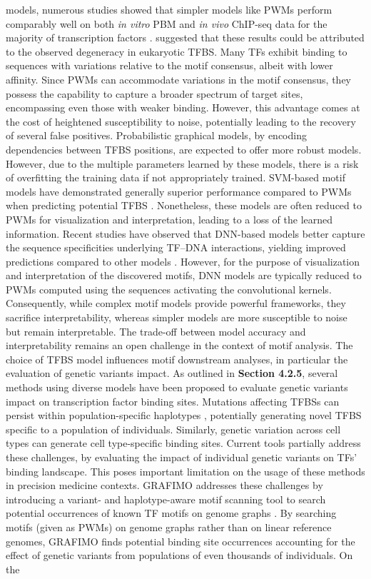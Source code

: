 \documentclass[a4paper, titlepage, openright]{book}
\newcommand{\grafimo}{GRAFIMO\xspace}
\begin{document}
models, numerous studies showed that simpler models like PWMs perform comparably well on both \emph{in vitro} PBM and \emph{in vivo} ChIP-seq data for the majority of transcription factors \citep{zhao2011quantitative,weirauch2013evaluation}. \cite{weirauch2013evaluation} suggested that these results could be attributed to the observed degeneracy in eukaryotic TFBS. Many TFs exhibit binding to sequences with variations relative to the motif consensus, albeit with lower affinity. Since PWMs can accommodate variations in the motif consensus, they possess the capability to capture a broader spectrum of target sites, encompassing even those with weaker binding. However, this advantage comes at the cost of heightened susceptibility to noise, potentially leading to the recovery of several false positives. Probabilistic graphical models, by encoding dependencies between TFBS positions, are expected to offer more robust models. However, due to the multiple parameters learned by these models, there is a risk of overfitting the training data if not appropriately trained. SVM-based motif models have demonstrated generally superior performance compared to PWMs when predicting potential TFBS \citep{ghandi2014enhanced}. Nonetheless, these models are often reduced to PWMs for visualization and interpretation, leading to a loss of the learned information. Recent studies have observed that DNN-based models better capture the sequence specificities underlying TF–DNA interactions, yielding improved predictions compared to other models \citep{trabelsi2019comprehensive}. However, for the purpose of visualization and interpretation of the discovered motifs, DNN models are typically reduced to PWMs computed using the sequences activating the convolutional kernels. Consequently, while complex motif models provide powerful frameworks, they sacrifice interpretability, whereas simpler models are more susceptible to noise but remain interpretable. The trade-off between model accuracy and interpretability remains an open challenge in the context of motif analysis. The choice of TFBS model influences motif downstream analyses, in particular the evaluation of genetic variants impact. As outlined in \textbf{Section 4.2.5}, several methods using diverse models have been proposed to evaluate genetic variants impact on transcription factor binding sites. Mutations affecting TFBSs can persist within population-specific haplotypes \citep{kasowski2010variation}, potentially generating novel TFBS specific to a population of individuals. Similarly, genetic variation across cell types can generate cell type-specific binding sites. Current tools partially address these challenges, by evaluating the impact of individual genetic variants on TFs' binding landscape. This poses important limitation on the usage of these methods in precision medicine contexts. \grafimo \citep{tognon2021grafimo} addresses these challenges by introducing a variant- and haplotype-aware motif scanning tool to search potential occurrences of known TF motifs on genome graphs \citep{paten2017genome}. By searching motifs (given as PWMs) on genome graphs rather than on linear reference genomes, \grafimo finds potential binding site occurrences accounting for the effect of genetic variants from populations of even thousands of individuals. On the 
\end{document}
